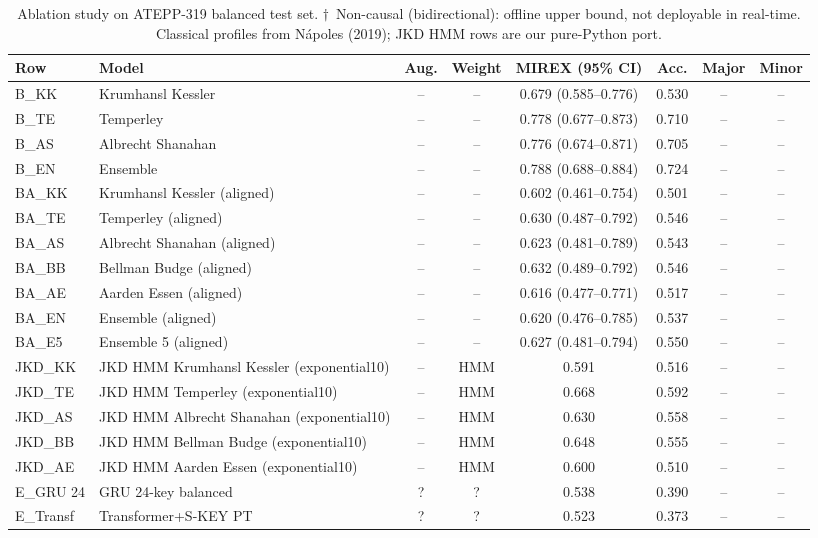\begin{table}[htbp]
\centering
\caption{Ablation study on ATEPP-319 balanced test set. $\dagger$~Non-causal (bidirectional): offline upper bound, not deployable in real-time. Classical profiles from N\'apoles (2019); JKD HMM rows are our pure-Python port.}
\label{tab:ablation}
\begin{tabular}{llcccccc}
\toprule
Row & Model & Aug. & Weight & MIREX (95\% CI) & Acc. & Major & Minor \\
\midrule
B_KK & Krumhansl Kessler & -- & -- & 0.679 (0.585--0.776) & 0.530 & -- & -- \\
B_TE & Temperley & -- & -- & 0.778 (0.677--0.873) & 0.710 & -- & -- \\
B_AS & Albrecht Shanahan & -- & -- & 0.776 (0.674--0.871) & 0.705 & -- & -- \\
B_EN & Ensemble & -- & -- & 0.788 (0.688--0.884) & 0.724 & -- & -- \\
BA_KK & Krumhansl Kessler (aligned) & -- & -- & 0.602 (0.461--0.754) & 0.501 & -- & -- \\
BA_TE & Temperley (aligned) & -- & -- & 0.630 (0.487--0.792) & 0.546 & -- & -- \\
BA_AS & Albrecht Shanahan (aligned) & -- & -- & 0.623 (0.481--0.789) & 0.543 & -- & -- \\
BA_BB & Bellman Budge (aligned) & -- & -- & 0.632 (0.489--0.792) & 0.546 & -- & -- \\
BA_AE & Aarden Essen (aligned) & -- & -- & 0.616 (0.477--0.771) & 0.517 & -- & -- \\
BA_EN & Ensemble (aligned) & -- & -- & 0.620 (0.476--0.785) & 0.537 & -- & -- \\
BA_E5 & Ensemble 5 (aligned) & -- & -- & 0.627 (0.481--0.794) & 0.550 & -- & -- \\
JKD_KK & JKD HMM Krumhansl Kessler (exponential10) & -- & HMM & 0.591 & 0.516 & -- & -- \\
JKD_TE & JKD HMM Temperley (exponential10) & -- & HMM & 0.668 & 0.592 & -- & -- \\
JKD_AS & JKD HMM Albrecht Shanahan (exponential10) & -- & HMM & 0.630 & 0.558 & -- & -- \\
JKD_BB & JKD HMM Bellman Budge (exponential10) & -- & HMM & 0.648 & 0.555 & -- & -- \\
JKD_AE & JKD HMM Aarden Essen (exponential10) & -- & HMM & 0.600 & 0.510 & -- & -- \\
E_GRU 24 & GRU 24-key balanced & ? & ? & 0.538 & 0.390 & -- & -- \\
E_Transf & Transformer+S-KEY PT & ? & ? & 0.523 & 0.373 & -- & -- \\

\end{tabular}
\end{table}
